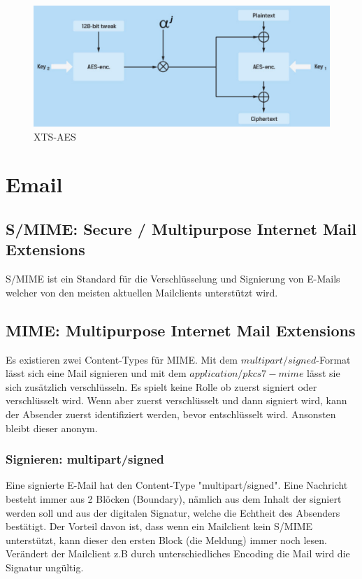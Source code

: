 \begin{figure}[h!]
\centering
\includegraphics[width=0.6\linewidth]{images/xts_aes}
\caption{XTS-AES}
\end{figure}

\section{Email}
\subsection{S/MIME: Secure / Multipurpose Internet Mail Extensions}
S/MIME ist ein Standard für die Verschlüsselung und Signierung von E-Mails welcher von den meisten aktuellen Mailclients unterstützt wird.

\subsection{MIME: Multipurpose Internet Mail Extensions}
Es existieren zwei Content-Types für MIME. Mit dem $multipart/signed$-Format lässt sich eine Mail signieren und mit dem $application/pkcs7-mime$ lässt sie sich zusätzlich verschlüsseln. Es spielt keine Rolle ob zuerst signiert oder verschlüsselt wird. Wenn aber zuerst verschlüsselt und dann signiert wird, kann der Absender zuerst identifiziert werden, bevor entschlüsselt wird. Ansonsten bleibt dieser anonym.
  
\subsubsection{Signieren: multipart/signed}
Eine signierte E-Mail hat den Content-Type "multipart/signed". Eine Nachricht besteht immer
aus 2 Blöcken (Boundary), nämlich aus dem Inhalt der signiert werden soll und aus 
der digitalen Signatur, welche die Echtheit des Absenders bestätigt. Der Vorteil davon ist, dass wenn ein Mailclient kein S/MIME unterstützt, kann dieser den ersten Block (die Meldung) immer noch lesen. Verändert der Mailclient z.B durch unterschiedliches Encoding die Mail wird die Signatur ungültig.

